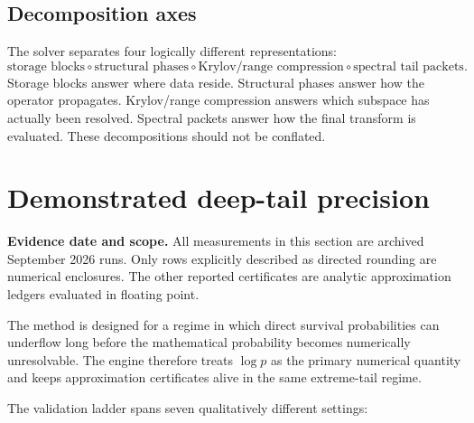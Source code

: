 \documentclass[11pt]{article}
\theoremstyle{definition}
\theoremstyle{remark}
\begin{document}
\subsection{Decomposition axes}

The solver separates four logically different representations:
\[
\boxed{
\text{storage blocks}
\circ
\text{structural phases}
\circ
\text{Krylov/range compression}
\circ
\text{spectral tail packets}.
}
\]
Storage blocks answer where data reside.  Structural phases answer how the
operator propagates.  Krylov/range compression answers which subspace has
actually been resolved.  Spectral packets answer how the final transform is
evaluated.  These decompositions should not be conflated.


\section{Demonstrated deep-tail precision}\label{sec:final-3}
\textbf{Evidence date and scope.} All measurements in this section are
archived September 2026 runs.  Only rows explicitly described as directed
rounding are numerical enclosures.  The other reported certificates are
analytic approximation ledgers evaluated in floating point.

The method is designed for a regime in which direct survival probabilities can
underflow long before the mathematical probability becomes numerically
unresolvable.  The engine therefore treats \(\log p\) as the primary numerical
quantity and keeps approximation certificates alive in the same extreme-tail
regime.

The validation ladder spans seven qualitatively different settings:
\end{document}

